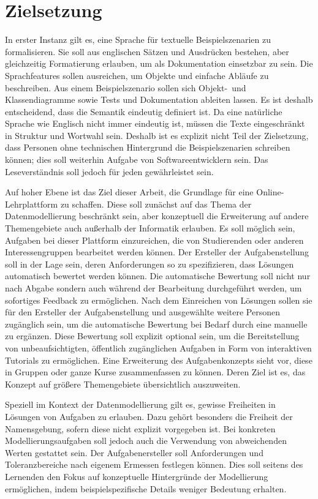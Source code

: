 \chapter{Zielsetzung}\label{ch:goals}

In erster Instanz gilt es, eine Sprache für textuelle Beispielszenarien zu formalisieren.
Sie soll aus englischen Sätzen und Ausdrücken bestehen, aber gleichzeitig Formatierung erlauben, um als Dokumentation einsetzbar zu sein.
Die Sprachfeatures sollen ausreichen, um Objekte und einfache Abläufe zu beschreiben.
Aus einem Beispielszenario sollen sich Objekt-\ und Klassendiagramme sowie Tests und Dokumentation ableiten lassen.
Es ist deshalb entscheidend, dass die Semantik eindeutig definiert ist.
Da eine natürliche Sprache wie Englisch nicht immer eindeutig ist, müssen die Texte eingeschränkt in Struktur und Wortwahl sein.
Deshalb ist es explizit nicht Teil der Zielsetzung, dass Personen ohne technischen Hintergrund die Beispielszenarien schreiben können;
dies soll weiterhin Aufgabe von Softwareentwicklern sein.
Das Leseverständnis soll jedoch für jeden gewährleistet sein.

Auf hoher Ebene ist das Ziel dieser Arbeit, die Grundlage für eine Online-Lehrplattform zu schaffen.
Diese soll zunächst auf das Thema der Datenmodellierung beschränkt sein, aber konzeptuell die Erweiterung auf andere Themengebiete auch außerhalb der Informatik erlauben.
Es soll möglich sein, Aufgaben bei dieser Plattform einzureichen, die von Studierenden oder anderen Interessengruppen bearbeitet werden können.
Der Ersteller der Aufgabenstellung soll in der Lage sein, deren Anforderungen so zu spezifizieren, dass Lösungen automatisch bewertet werden können.
Die automatische Bewertung soll nicht nur nach Abgabe sondern auch während der Bearbeitung durchgeführt werden, um sofortiges Feedback zu ermöglichen.
Nach dem Einreichen von Lösungen sollen sie für den Ersteller der Aufgabenstellung und ausgewählte weitere Personen zugänglich sein, um die automatische Bewertung bei Bedarf durch eine manuelle zu ergänzen.
Diese Bewertung soll explizit optional sein, um die Bereitstellung von unbeaufsichtigten, öffentlich zugänglichen Aufgaben in Form von interaktiven Tutorials zu ermöglichen.
Eine Erweiterung des Aufgabenkonzepts sieht vor, diese in Gruppen oder ganze Kurse zusammenfassen zu können.
Deren Ziel ist es, das Konzept auf größere Themengebiete übersichtlich auszuweiten.

Speziell im Kontext der Datenmodellierung gilt es, gewisse Freiheiten in Lösungen von Aufgaben zu erlauben.
Dazu gehört besonders die Freiheit der Namensgebung, sofern diese nicht explizit vorgegeben ist.
Bei konkreten Modellierungsaufgaben soll jedoch auch die Verwendung von abweichenden Werten gestattet sein.
Der Aufgabenersteller soll Anforderungen und Toleranzbereiche nach eigenem Ermessen festlegen können.
Dies soll seitens des Lernenden den Fokus auf konzeptuelle Hintergründe der Modellierung ermöglichen, indem beispielspezifische Details weniger Bedeutung erhalten.
